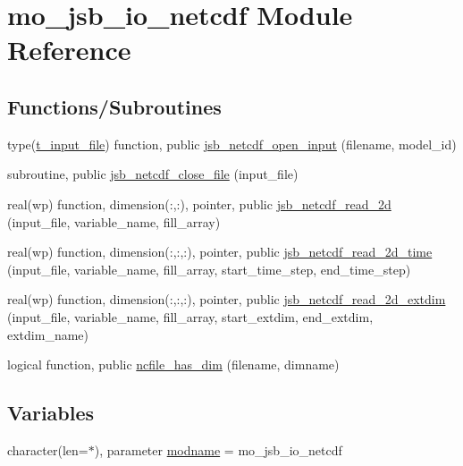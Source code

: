 \hypertarget{namespacemo__jsb__io__netcdf}{}\section{mo\+\_\+jsb\+\_\+io\+\_\+netcdf Module Reference}
\label{namespacemo__jsb__io__netcdf}
\subsection*{Functions/\+Subroutines}
\begin{DoxyCompactItemize}
\item 
type(\hyperlink{structmo__jsb__io__netcdf__iface_1_1t__input__file}{t\+\_\+input\+\_\+file}) function, public \hyperlink{namespacemo__jsb__io__netcdf_a65a68943467734db9da1c09c39e50b4d}{jsb\+\_\+netcdf\+\_\+open\+\_\+input} (filename, model\+\_\+id)
\item 
subroutine, public \hyperlink{namespacemo__jsb__io__netcdf_a930c28c3c36a4cad53a44d7fd0849fd2}{jsb\+\_\+netcdf\+\_\+close\+\_\+file} (input\+\_\+file)
\item 
real(wp) function, dimension(\+:,\+:), pointer, public \hyperlink{namespacemo__jsb__io__netcdf_a6779dd8b9cd04d70eb5aba842875f0da}{jsb\+\_\+netcdf\+\_\+read\+\_\+2d} (input\+\_\+file, variable\+\_\+name, fill\+\_\+array)
\item 
real(wp) function, dimension(\+:,\+:,\+:), pointer, public \hyperlink{namespacemo__jsb__io__netcdf_a5cdd38386756d348b9d7efeaccc170bb}{jsb\+\_\+netcdf\+\_\+read\+\_\+2d\+\_\+time} (input\+\_\+file, variable\+\_\+name, fill\+\_\+array, start\+\_\+time\+\_\+step, end\+\_\+time\+\_\+step)
\item 
real(wp) function, dimension(\+:,\+:,\+:), pointer, public \hyperlink{namespacemo__jsb__io__netcdf_a91c6a275275258e361e32ffed8362b08}{jsb\+\_\+netcdf\+\_\+read\+\_\+2d\+\_\+extdim} (input\+\_\+file, variable\+\_\+name, fill\+\_\+array, start\+\_\+extdim, end\+\_\+extdim, extdim\+\_\+name)
\item 
logical function, public \hyperlink{namespacemo__jsb__io__netcdf_a00a86f02344a16ec5309e26c61c3c8f1}{ncfile\+\_\+has\+\_\+dim} (filename, dimname)
\end{DoxyCompactItemize}
\subsection*{Variables}
\begin{DoxyCompactItemize}
\item 
character(len=$\ast$), parameter \hyperlink{namespacemo__jsb__io__netcdf_a9e42139581fe6002bdbc58266020b84a}{modname} = \textquotesingle{}mo\+\_\+jsb\+\_\+io\+\_\+netcdf\textquotesingle{}
\end{DoxyCompactItemize}


